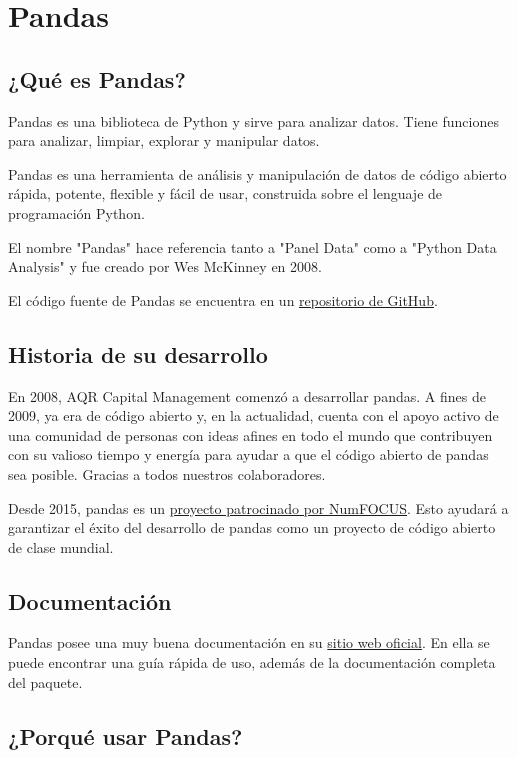 \chapter{Pandas}

\section{¿Qué es Pandas?}

Pandas es una biblioteca de Python y sirve para analizar datos. Tiene
funciones para analizar, limpiar, explorar y manipular datos.

Pandas es una herramienta de análisis y manipulación de datos de código
abierto rápida, potente, flexible y fácil de usar, construida sobre el
lenguaje de programación Python.

El nombre "Pandas" hace referencia tanto a "Panel Data" como a "Python
Data Analysis" y fue creado por Wes McKinney en 2008.

El código fuente de Pandas se encuentra en un
\href{https://github.com/pandas-dev/pandas}{repositorio de GitHub}.

\section{Historia de su desarrollo}

En 2008, AQR Capital Management comenzó a desarrollar pandas. A fines de
2009, ya era de código abierto y, en la actualidad, cuenta con el apoyo
activo de una comunidad de personas con ideas afines en todo el mundo
que contribuyen con su valioso tiempo y energía para ayudar a que el
código abierto de pandas sea posible. Gracias a todos nuestros
colaboradores.

Desde 2015, pandas es un
\href{https://numfocus.org/sponsored-projects}{proyecto patrocinado por
NumFOCUS}. Esto ayudará a garantizar el éxito del desarrollo de pandas
como un proyecto de código abierto de clase mundial.

\section{Documentación}

Pandas posee una muy buena documentación en su
\href{https://pandas.pydata.org/docs/}{sitio web oficial}. En ella se
puede encontrar una guía rápida de uso, además de la documentación
completa del paquete.

\section{¿Porqué usar Pandas?}

